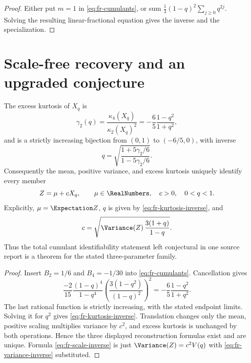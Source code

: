 \begin{proof}
Either put \(m=1\) in \cref{eq:fr-cumulants}, or sum
\(\frac13(1-q)^2\sum_{j\ge0}q^{2j}\).  Solving the resulting
linear-fractional equation gives the inverse and the specialization.
\end{proof}

\section{Scale-free recovery and an upgraded conjecture}
\label{sec:fr-scale-free}

\begin{theorem}
\label{thm:fr-total-identifiability}
The excess kurtosis of \(X_q\) is
\begin{equation}
 \gamma_2(q)=\frac{\kappa_4(X_q)}{\kappa_2(X_q)^2}
 =-\frac65\frac{1-q^2}{1+q^2},
 \label{eq:fr-kurtosis}
\end{equation}
and is a strictly increasing bijection from \((0,1)\) to \((-6/5,0)\), with
inverse
\begin{equation}
 q=\sqrt{\frac{1+5\gamma_2/6}{1-5\gamma_2/6}}.
 \label{eq:fr-kurtosis-inverse}
\end{equation}
Consequently the mean, positive variance, and excess kurtosis uniquely
identify every member
\[
 Z=\mu+cX_q,
 \qquad \mu\in\RealNumbers,\quad c>0,\quad0<q<1.
\]
Explicitly, \(\mu=\Expectation Z\), \(q\) is given by
\cref{eq:fr-kurtosis-inverse}, and
\begin{equation}
 c=\sqrt{\Variance(Z)\,\frac{3(1+q)}{1-q}}.
 \label{eq:fr-scale-inverse}
\end{equation}
Thus the total cumulant identifiability statement left conjectural in one
source report is a theorem for the stated three-parameter family.
\end{theorem}

\begin{proof}
Insert \(B_2=1/6\) and \(B_4=-1/30\) into
\cref{eq:fr-cumulants}.  Cancellation gives
\[
 \frac{-2}{15}\frac{(1-q)^4}{1-q^4}
 \left(\frac{3(1-q^2)}{(1-q)^2}\right)^2
 =-\frac65\frac{1-q^2}{1+q^2}.
\]
The last rational function is strictly increasing, with the stated endpoint
limits.  Solving it for \(q^2\) gives
\cref{eq:fr-kurtosis-inverse}.  Translation changes only the mean, positive
scaling multiplies variance by \(c^2\), and excess kurtosis is unchanged by
both operations.  Hence the three displayed reconstruction formulas exist
and are unique.  Formula \cref{eq:fr-scale-inverse} is just
\(\Variance(Z)=c^2V(q)\) with \cref{eq:fr-variance-inverse} substituted.
\end{proof}

